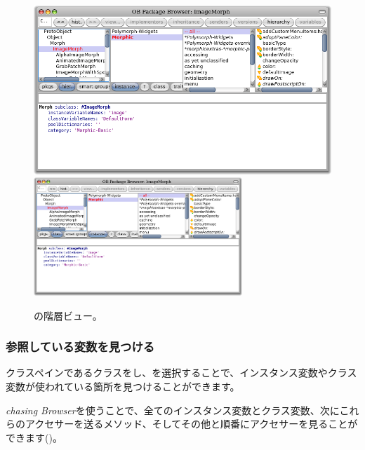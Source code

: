 \documentclass[a4paper,10pt,twoside]{book}
\begin{document}
\begin{figure}[btp]
	\begin{center}
	\ifluluelse
		{\includegraphics[width=\textwidth]{hierarchyBrowser}}
		{\includegraphics[width=0.7\textwidth]{hierarchyBrowser}}
	\end{center}
	\caption{の階層ビュー。}
\end{figure}

\subsubsection{参照している変数を見つける}

クラスペインであるクラスを\actclick し、を選択することで、インスタンス変数やクラス変数が使われている箇所を見つけることができます。

\emph{chasing Browser}を使うことで、全てのインスタンス変数とクラス変数、次にこれらのアクセサーを送るメソッド、そしてその他と順番にアクセサーを見ることができます()。
\end{document}

